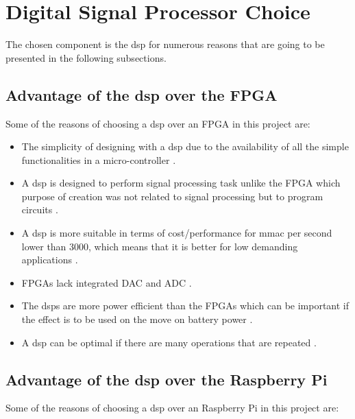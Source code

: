 \section{Digital Signal Processor Choice}

The chosen component is the \gls{dsp} for numerous reasons that are going to be presented in the following subsections.

\subsection{Advantage of the \gls{dsp} over the FPGA}

Some of the  reasons of choosing a \gls{dsp} over an FPGA in this project are:
 
\begin{itemize}

\item  The simplicity of designing with a \gls{dsp} due to the availability of all the simple functionalities in a micro-controller \citep{eetimes}. 

\item A \gls{dsp} is designed to perform signal processing task unlike the FPGA which purpose of creation was not related to signal processing but to program circuits \citep{eetimes}. 

\item A \gls{dsp} is more suitable in terms of cost/performance for \gls{mmac} per second lower than 3000, which means that it is better for low demanding applications \citep{eetimes}. 

\item FPGAs lack integrated DAC and ADC \citep{eetimes}. 

\item The \gls{dsp}s are more power efficient than the FPGAs which can be important if the effect is to be used on the move on battery power \citep{rtcmag}. 

\item A \gls{dsp} can be optimal if there are many operations that are repeated \citep{eetimes} \citep{hunteng}. 

\end{itemize}

\subsection{Advantage of the \gls{dsp} over the Raspberry Pi}

Some of the  reasons of choosing a \gls{dsp} over an Raspberry Pi in this project are:
 
